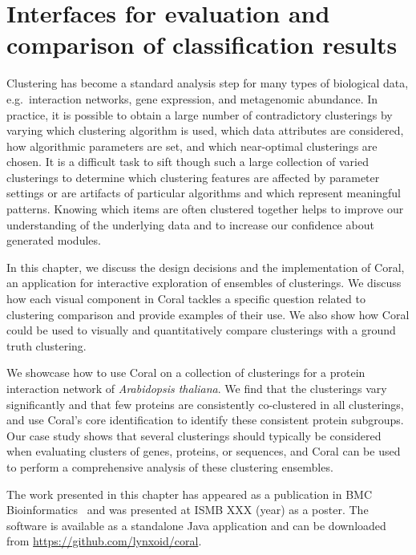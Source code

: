\documentclass[12pt]{cmuthesis}
\makeatletter
\newcommand\Coral{Coral\xspace}
\newcommand{\eg}{e.g.\@}
\makeatother
\begin{document}
\chapter{Interfaces for evaluation and comparison of classification results}

  Clustering has become a standard analysis step for many types of biological data, \eg~interaction networks, gene expression, and metagenomic abundance. In practice, it is possible to obtain a large number of contradictory clusterings by varying which clustering algorithm is used, which data attributes are considered, how algorithmic parameters are set, and  which near-optimal clusterings are chosen. It is a difficult task to sift though such a large collection of varied clusterings to determine which clustering features are affected by parameter settings or are artifacts of particular algorithms and which represent meaningful patterns. Knowing which items are often clustered together helps to improve our understanding of the underlying data and to increase our confidence about generated modules.

  In this chapter, we discuss the design decisions and the implementation of \Coral, an application for interactive exploration of ensembles of clusterings. We discuss how each visual component in \Coral tackles a specific question related to clustering comparison and provide examples of their use. We also show how \Coral could be used to visually and quantitatively compare clusterings with a ground truth clustering. 

  We showcase how to use \Coral on a collection of clusterings for a protein interaction network of \textit{Arabidopsis thaliana}. We find that the clusterings vary significantly and that few proteins are consistently co-clustered in all clusterings, and use \Coral's core identification to identify these consistent protein subgroups. Our case study shows that several clusterings should typically be considered when evaluating clusters of genes, proteins, or sequences, and Coral can be used to perform a comprehensive analysis of these clustering ensembles.

  The work presented in this chapter has appeared as a publication in BMC Bioinformatics~\cite{Filippova2012} and was presented at ISMB XXX (year) as a poster. The software is available as a standalone Java application and can be downloaded from \url{https://github.com/lynxoid/coral}.
\end{document}
